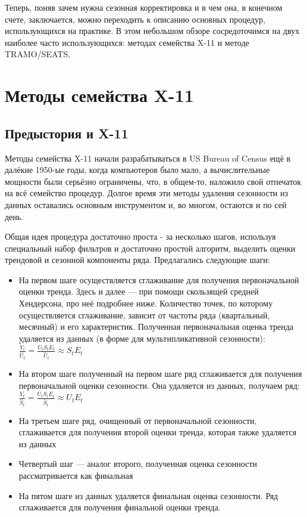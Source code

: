 \documentclass[final,pdftex]{../../template/epsilonj}\usepackage[]{graphicx}\usepackage[]{color}
\begin{document}
Теперь, поняв зачем нужна сезонная корректировка и в чем она, в конечном счете, заключается, можно переходить к описанию основных процедур, использующихся на практике. 
В этом небольшом обзоре сосредоточимся на двух наиболее часто использующихся: методах семейства X-11 и методе TRAMO/SEATS. 

\section{Методы семейства X-11} 
\subsection{Предыстория и X-11}

Методы семейства X-11 начали разрабатываться в US Bureau of Census ещё в далёкие 1950-ые годы, когда компьютеров было мало, а вычислительные мощности были серьёзно ограничены, что, в общем-то, наложило свой отпечаток на всё семейство процедур. Долгое время эти методы удаления сезонности из данных оставались основным инструментом и, во многом, остаются и по сей день. 

Общая идея процедура достаточно проста - за несколько шагов, используя специальный набор фильтров и достаточно простой алгоритм, выделить оценки трендовой и сезонной компоненты ряда. Предлагались следующие шаги:

\begin{itemize}
\item На первом шаге осуществляется сглаживание для получения первоначальной оценки тренда. Здесь и далее --- при помощи скользящей средней Хендерсона, про неё подробнее ниже.  Количество точек, по которому осуществляется сглаживание, зависит от частоты ряда (квартальный, месячный) и его характеристик. Полученная первоначальная оценка тренда удаляется из данных (в форме для мультипликативной сезонности): $\frac{Y_t}{\hat{U}_t} = \frac{U_t S_t E_t}{\hat{U}_t} \approx S_t E_t$
\item На втором шаге полученный на первом шаге ряд сглаживается для получения первоначальной оценки сезонности. Она удаляется из данных, получаем ряд:  $\frac{Y_t}{\hat{S}_t} = \frac{U_t S_t E_t}{\hat{S}_t} \approx U_t E_t$
\item На третьем шаге ряд, очищенный от первоначальной сезонности, сглаживается для получения второй оценки тренда, которая также удаляется из данных
\item Четвертый шаг --- аналог второго, полученная оценка сезонности рассматривается как финальная
\item На пятом шаге из данных удаляется финальная оценка сезонности. Ряд сглаживается для получения финальной оценки тренда. 
\end{itemize}
\end{document}

